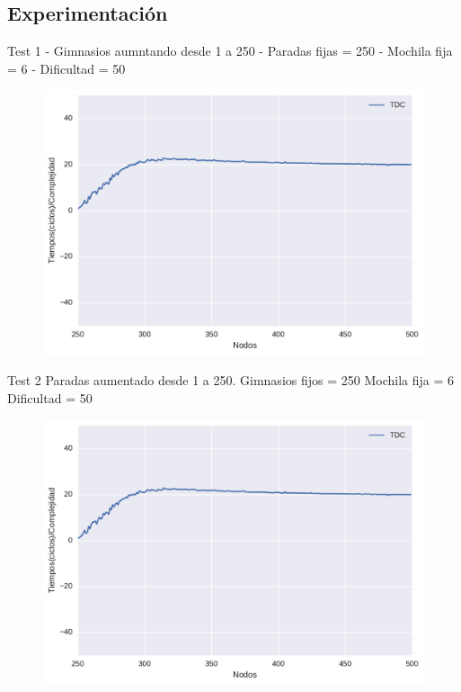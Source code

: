\subsection{Experimentación}


Test 1 - 
Gimnasios aumntando desde 1 a 250 - 
Paradas fijas = 250 - 
Mochila fija = 6 - 
Dificultad = 50

\begin{figure}[H]
  \begin{center}
    \includegraphics[scale=0.4]{imagenes/ej2test1tiempos.pdf}
    \caption{}
    \label{}
  \end{center}
\end{figure}


Test 2
Paradas aumentado desde 1 a 250.
Gimnasios fijos = 250
Mochila fija = 6
Dificultad = 50

\begin{figure}[H]
  \begin{center}
    \includegraphics[scale=0.4]{imagenes/ej2test1tiempos.pdf}
    \caption{}
    \label{}
  \end{center}
\end{figure}


